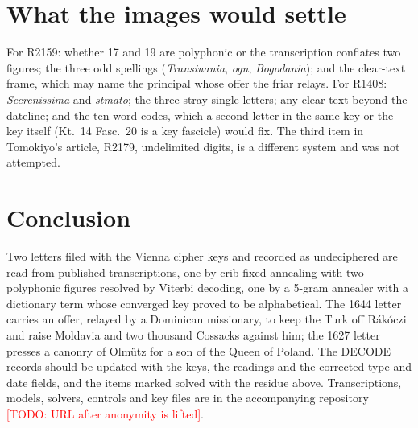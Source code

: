 \documentclass[11pt]{article}
\newcommand{\todo}[1]{\textcolor{red}{[TODO: #1]}}
\begin{document}
\section{What the images would settle}\label{sec:images}

For R2159: whether 17 and 19 are polyphonic or the transcription conflates two figures; the three odd spellings (\emph{Transiuania}, \emph{ogn}, \emph{Bogodania}); and the clear-text frame, which may name the principal whose offer the friar relays. For R1408: \emph{Seerenissima} and \emph{stmato}; the three stray single letters; any clear text beyond the dateline; and the ten word codes, which a second letter in the same key or the key itself (Kt.~14 Fasc.~20 is a key fascicle) would fix. The third item in Tomokiyo's article, R2179, undelimited digits, is a different system and was not attempted.

\section{Conclusion}

Two letters filed with the Vienna cipher keys and recorded as undeciphered are read from published transcriptions, one by crib-fixed annealing with two polyphonic figures resolved by Viterbi decoding, one by a 5-gram annealer with a dictionary term whose converged key proved to be alphabetical. The 1644 letter carries an offer, relayed by a Dominican missionary, to keep the Turk off R\'ak\'oczi and raise Moldavia and two thousand Cossacks against him; the 1627 letter presses a canonry of Olm\"utz for a son of the Queen of Poland. The DECODE records should be updated with the keys, the readings and the corrected type and date fields, and the items marked solved with the residue above. Transcriptions, models, solvers, controls and key files are in the accompanying repository \todo{URL after anonymity is lifted}.



\end{document}
